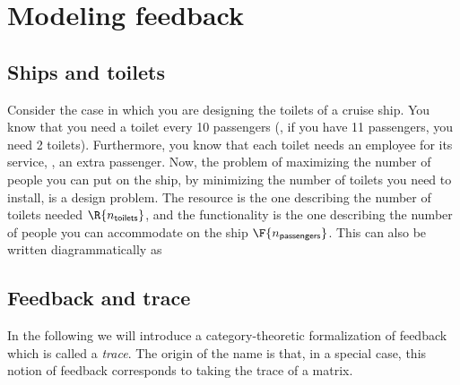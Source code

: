 
\section{Modeling feedback}
\label{sec:modeling-feedback}



\subsection{Ships and toilets}

Consider the case in which you are designing the toilets of a cruise ship.
You know that you need a toilet every 10 passengers (\ie, if you have 11 passengers, you need 2 toilets).
Furthermore, you know that each toilet needs an employee for its service, \ie, an extra passenger.
Now, the problem of maximizing the number of people you can put on the ship, by minimizing the number of toilets you need to install, is a design problem.
The resource  is the one describing the number of toilets needed $\R{n_\mathsf{toilets}}$, and the functionality  is the one describing the number of people you can accommodate on the ship $\F{n_\mathsf{passengers}}$.
This can also be written diagrammatically as


\subsection{Feedback and trace}

In the following we will introduce a category-theoretic formalization of feedback which is called a \emph{trace}.
The origin of the name is that, in a special case, this notion of feedback corresponds to taking the trace of a matrix.


